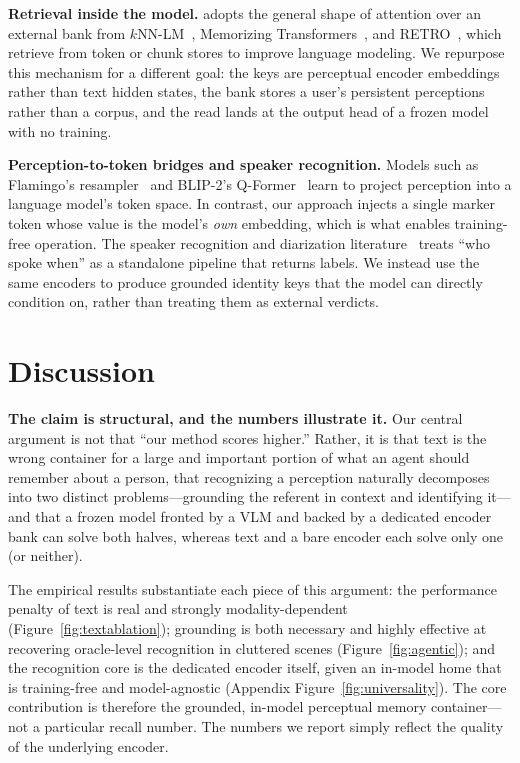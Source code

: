 \textbf{Retrieval inside the model.} \attmem{} adopts the general shape of attention over an external bank from $k$NN-LM~\citep{khandelwal2020nearest}, Memorizing Transformers~\citep{wu2022memorizing}, and RETRO~\citep{retro}, which retrieve from token or chunk stores to improve language modeling. We repurpose this mechanism for a different goal: the keys are perceptual encoder embeddings rather than text hidden states, the bank stores a user's persistent perceptions rather than a corpus, and the read lands at the output head of a frozen model with no training.

\textbf{Perception-to-token bridges and speaker recognition.} Models such as Flamingo's resampler~\citep{flamingo} and BLIP-2's Q-Former~\citep{blip2} learn to project perception into a language model's token space. In contrast, our approach injects a single marker token whose value is the model's \emph{own} embedding, which is what enables training-free operation. The speaker recognition and diarization literature~\citep{voxceleb,ecapa,diarizationreview} treats ``who spoke when'' as a standalone pipeline that returns labels. We instead use the same encoders to produce grounded identity keys that the model can directly condition on, rather than treating them as external verdicts.

\section{Discussion}
\label{sec:discussion}

\textbf{The claim is structural, and the numbers illustrate it.} Our central argument is not that ``our method scores higher.'' Rather, it is that text is the wrong container for a large and important portion of what an agent should remember about a person, that recognizing a perception naturally decomposes into two distinct problems---grounding the referent in context and identifying it---and that a frozen model fronted by a VLM and backed by a dedicated encoder bank can solve both halves, whereas text and a bare encoder each solve only one (or neither).

The empirical results substantiate each piece of this argument: the performance penalty of text is real and strongly modality-dependent (Figure~\ref{fig:textablation}); grounding is both necessary and highly effective at recovering oracle-level recognition in cluttered scenes (Figure~\ref{fig:agentic}); and the recognition core is the dedicated encoder itself, given an in-model home that is training-free and model-agnostic (Appendix Figure~\ref{fig:universality}). The core contribution is therefore the grounded, in-model perceptual memory container---not a particular recall number. The numbers we report simply reflect the quality of the underlying encoder.

